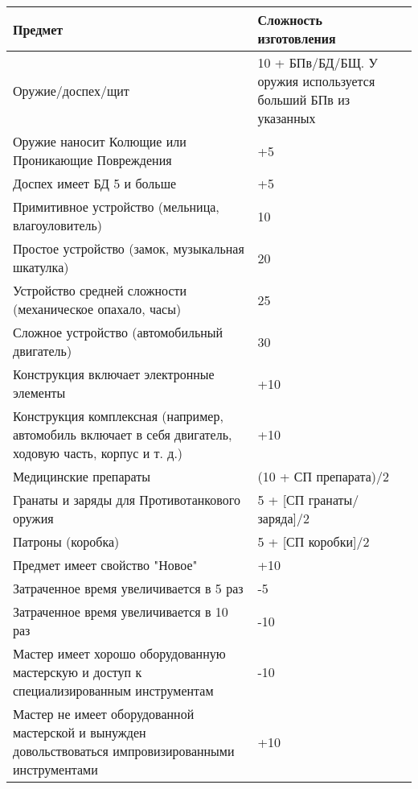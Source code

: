 \begin{center} \begin{tabular}{|p{8cm}|p{6cm}|} \hline
  \textbf{Предмет} & \textbf{Сложность изготовления} \\ \hline
  Оружие/доспех/щит & 10 + БПв/БД/БЩ. У оружия используется больший БПв из указанных \\ \hline
  Оружие наносит Колющие или Проникающие Повреждения & +5 \\ \hline
  Доспех имеет БД 5 и больше & +5 \\ \hline
  Примитивное устройство (мельница, влагоуловитель) & 10 \\ \hline
  Простое устройство (замок, музыкальная шкатулка) & 20 \\ \hline
  Устройство средней сложности (механическое опахало, часы) & 25 \\ \hline
  Сложное устройство (автомобильный двигатель) & 30 \\ \hline
  Конструкция включает электронные элементы & +10 \\ \hline
  Конструкция комплексная (например, автомобиль включает в себя двигатель, ходовую часть, корпус и т. д.) & +10 \\ \hline
  Медицинские препараты & (10 + СП препарата)/2 \\ \hline
  Гранаты и заряды для Противотанкового оружия & 5 + [СП гранаты/заряда]/2 \\ \hline
  Патроны (коробка) & 5 + [СП коробки]/2 \\ \hline
  Предмет имеет свойство "Новое" & +10 \\ \hline
  Затраченное время увеличивается в 5 раз & -5 \\ \hline
  Затраченное время увеличивается в 10 раз & -10 \\ \hline
  Мастер имеет хорошо оборудованную мастерскую и доступ к специализированным инструментам & -10 \\ \hline
  Мастер не имеет оборудованной мастерской и вынужден довольствоваться импровизированными инструментами & +10 \\ \hline
\end{tabular} \end{center}